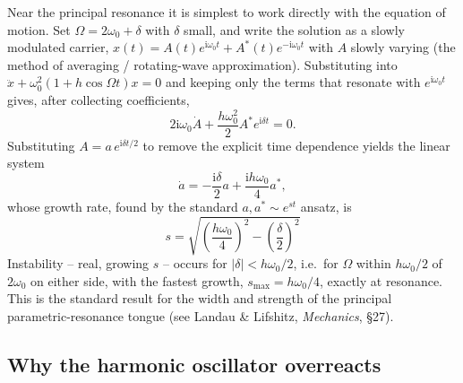 \documentclass[11pt]{book}
\newcommand{\ii}{\mathrm{i}}
\begin{document}
Near the principal resonance it is simplest to work directly with the equation of motion. Set
$\Omega = 2\omega_0 + \delta$ with $\delta$ small, and write the solution as a slowly modulated
carrier, $x(t) = A(t)e^{\ii\omega_0 t} + A^*(t)e^{-\ii\omega_0 t}$ with $A$ slowly varying (the
method of averaging / rotating-wave approximation). Substituting into $\ddot x +
\omega_0^2(1+h\cos\Omega t)x = 0$ and keeping only the terms that resonate with $e^{\ii\omega_0 t}$
gives, after collecting coefficients,
\begin{equation}
2\ii\omega_0\dot A + \frac{h\omega_0^2}{2}A^*e^{\ii\delta t} = 0.
\end{equation}
Substituting $A = a\,e^{\ii\delta t/2}$ to remove the explicit time dependence yields the linear
system
\begin{equation}
\dot a = -\frac{\ii\delta}{2}a + \frac{\ii h\omega_0}{4}a^*,
\end{equation}
whose growth rate, found by the standard $a,a^*\sim e^{st}$ ansatz, is
\begin{equation}
\boxed{\ s = \sqrt{\left(\frac{h\omega_0}{4}\right)^2 - \left(\frac{\delta}{2}\right)^2}\ }
\label{eq:growthrate}
\end{equation}
Instability -- real, growing $s$ -- occurs for $|\delta| < h\omega_0/2$, i.e.\ for $\Omega$ within
$h\omega_0/2$ of $2\omega_0$ on either side, with the fastest growth, $s_{\max} = h\omega_0/4$,
exactly at resonance. This is the standard result for the width and strength of the principal
parametric-resonance tongue (see Landau \& Lifshitz, \emph{Mechanics}, \S27).

\subsection{Why the harmonic oscillator overreacts}
\label{sec:isochronism}
\end{document}
